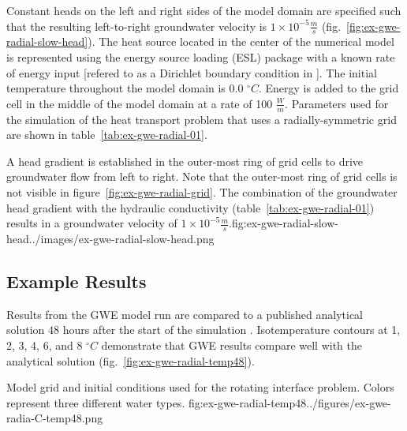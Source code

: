 Constant heads on the left and right sides of the model domain are specified such that the resulting left-to-right groundwater velocity is $1 \times 10^{-5} \tfrac{m}{s}$ (fig.~\ref{fig:ex-gwe-radial-slow-head}).  The heat source located in the center of the numerical model is represented using the energy source loading (ESL) package with a known rate of energy input [refered to as a Dirichlet boundary condition in \cite{alKhoury2020}].  The initial temperature throughout the model domain is 0.0 $^{\circ}C$. Energy is added to the grid cell in the middle of the model domain at a rate of 100 $\tfrac{W}{m}$.  Parameters used for the \mf simulation of the heat transport problem that uses a radially-symmetric grid are shown in table~\ref{tab:ex-gwe-radial-01}.



\begin{StandardFigure}{
                                     A head gradient is established in the outer-most ring of grid cells to drive groundwater flow from left to right. Note that the outer-most ring of grid cells is not visible in figure~\ref{fig:ex-gwe-radial-grid}.  The combination of the groundwater head gradient with the hydraulic conductivity (table~\ref{tab:ex-gwe-radial-01}) results in a groundwater velocity of $1 \times 10^{-5} \tfrac{m}{s}$.}{fig:ex-gwe-radial-slow-head}{../images/ex-gwe-radial-slow-head.png}
\end{StandardFigure}            

\subsection{Example Results}

Results from the GWE model run are compared to a published analytical solution 48 hours after the start of the simulation \cite{alKhoury2020}.  Isotemperature contours at 1, 2, 3, 4, 6, and 8 $^{\circ}C$ demonstrate that GWE results compare well with the analytical solution (fig.~\ref{fig:ex-gwe-radial-temp48}).

\begin{StandardFigure}{
                                     Model grid and initial conditions used for the rotating interface problem.  Colors represent three different water types.
                                     }{fig:ex-gwe-radial-temp48}{../figures/ex-gwe-radia-C-temp48.png}
\end{StandardFigure}                                 
